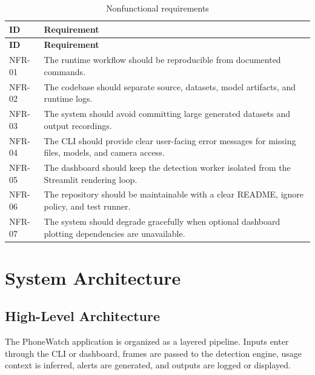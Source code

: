 \documentclass[12pt,a4paper]{report}
\newcommand{\projectname}{PhoneWatch}
\begin{document}
\begin{longtable}{p{}p{}}
\caption{Nonfunctional requirements}\\
\toprule
\textbf{ID} & \textbf{Requirement} \\
\midrule
\endfirsthead
\toprule
\textbf{ID} & \textbf{Requirement} \\
\midrule
\endhead
NFR-01 & The runtime workflow should be reproducible from documented commands. \\
NFR-02 & The codebase should separate source, datasets, model artifacts, and runtime logs. \\
NFR-03 & The system should avoid committing large generated datasets and output recordings. \\
NFR-04 & The CLI should provide clear user-facing error messages for missing files, models, and camera access. \\
NFR-05 & The dashboard should keep the detection worker isolated from the Streamlit rendering loop. \\
NFR-06 & The repository should be maintainable with a clear README, ignore policy, and test runner. \\
NFR-07 & The system should degrade gracefully when optional dashboard plotting dependencies are unavailable. \\
\bottomrule
\end{longtable}

\chapter{System Architecture}

\section{High-Level Architecture}

The \projectname{} application is organized as a layered pipeline. Inputs enter through the CLI or dashboard, frames are passed to the detection engine, usage context is inferred, alerts are generated, and outputs are logged or displayed.
\end{document}
